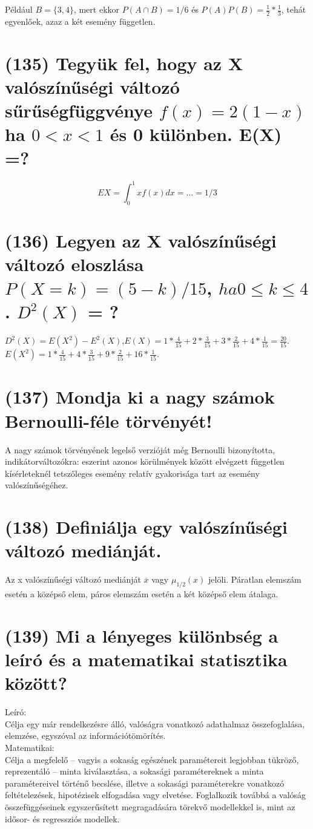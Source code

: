 \documentclass[12p]{article}
\begin{document}
 Például $B = \{3, 4\}$, mert ekkor $P(A \cap B) = 1/6$ és $P(A)P(B) = \frac{1}{2} * \frac{1}{3}$, tehát egyenlőek, azaz a két esemény független.

\section{(135) Tegyük fel, hogy az X valószínűségi változó sűrűségfüggvénye $f(x) = 2(1-x)$ ha $0 < x < 1$ és 0 különben. E(X) =? }

$$EX = \int^1_0 xf(x)dx = ... = 1/3$$

\section{(136) Legyen az X valószínűségi változó eloszlása $P(X = k) = (5 - k)/15$, $ha 0 \leq k \leq 4$. $D^2(X)$ = ?}

$D^2(X) = E(X^2) - E^2(X)$,$E(X) = 1 * \frac{4}{15} + 2 * \frac{3}{15} + 3 * \frac{2}{15} + 4 * \frac{1}{15} = \frac{20}{15}$.\\
$E(X^2) = 1 * \frac{4}{15} + 4 * \frac{3}{15} + 9 * \frac{2}{15} + 16 * \frac{1}{15}$.

\section{(137) Mondja ki a nagy számok Bernoulli-féle törvényét!}

A nagy számok törvényének legelső verzióját
még Bernoulli bizonyította,
indikátorváltozókra: eszerint azonos
körülmények között elvégzett független
kísérleteknél tetszőleges esemény relatív
gyakorisága tart az esemény
valószínűségéhez.

\section{(138) Definiálja egy valószínűségi változó mediánját.}

Az x valószínűségi változó mediánját $\overline{x}$ vagy $\mu_{1/2}(x)$ jelöli.
Páratlan elemszám esetén a középső elem, páros elemszám esetén a két középső elem átalaga.

\section{(139) Mi a lényeges különbség a leíró és a matematikai statisztika között?}

Leíró:\\
Célja egy már rendelkezésre álló, valóságra vonatkozó adathalmaz összefoglalása, elemzése, egyszóval az információtömörítés.\\
Matematikai:\\
Célja a megfelelő – vagyis a sokaság egészének paramétereit legjobban tükröző, reprezentáló – minta kiválasztása, a sokasági paramétereknek a minta paramétereivel történő becslése, illetve a sokasági paraméterekre vonatkozó feltételezések, hipotézisek elfogadása vagy elvetése. Foglalkozik továbbá a valóság összefüggéseinek egyszerűsített megragadására törekvő modellekkel is, mint az idősor- és regressziós modellek.
\end{document}
